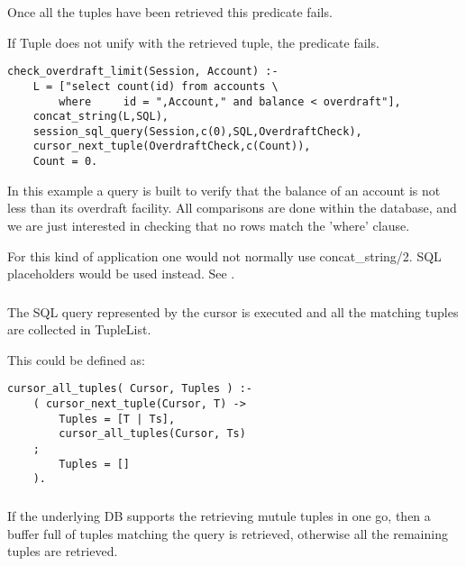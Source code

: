 Once all the tuples have been retrieved this predicate fails.

If Tuple does not unify with the retrieved tuple, the predicate fails.

\begin{verbatim}
check_overdraft_limit(Session, Account) :-
    L = ["select count(id) from accounts \
        where     id = ",Account," and balance < overdraft"],
    concat_string(L,SQL),
    session_sql_query(Session,c(0),SQL,OverdraftCheck),
    cursor_next_tuple(OverdraftCheck,c(Count)),
    Count = 0.
\end{verbatim}
In this example a query is built to verify that the balance of an
account is not less than its overdraft facility. All comparisons
are done within the database, and we are just interested in checking
that no rows match the 'where' clause.

For this kind of application one would not normally use
concat_string/2. SQL placeholders would be used instead. See
.


\subsubsection
{}
\label{cursor-all-tuples/2}

The SQL query represented by the cursor is executed and all
the matching tuples are collected in TupleList.

This could be defined as:

\begin{verbatim}
cursor_all_tuples( Cursor, Tuples ) :-
    ( cursor_next_tuple(Cursor, T) ->
        Tuples = [T | Ts],
        cursor_all_tuples(Cursor, Ts)
    ;
        Tuples = []
    ).
\end{verbatim}

\subsubsection
{}
\label{cursor-N-tuples/4}

If the underlying DB supports the retrieving mutule tuples in one go, then
a buffer full of tuples matching the query is retrieved, otherwise all the
remaining tuples are retrieved.


